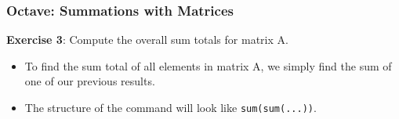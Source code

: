 \documentclass{beamer}
\begin{document}
\begin{frame}
\frametitle{Octave: Summations with Matrices}
\LARGE
\textbf{Exercise 3}: Compute the overall sum totals for matrix A.\\

\begin{itemize}
\item To find the sum total of all elements in matrix A, we simply find the sum of one of our previous results.
\item The structure of the command will look like \texttt{sum(sum(...))}.
\end{itemize} 

\end{frame}
\end{document}
